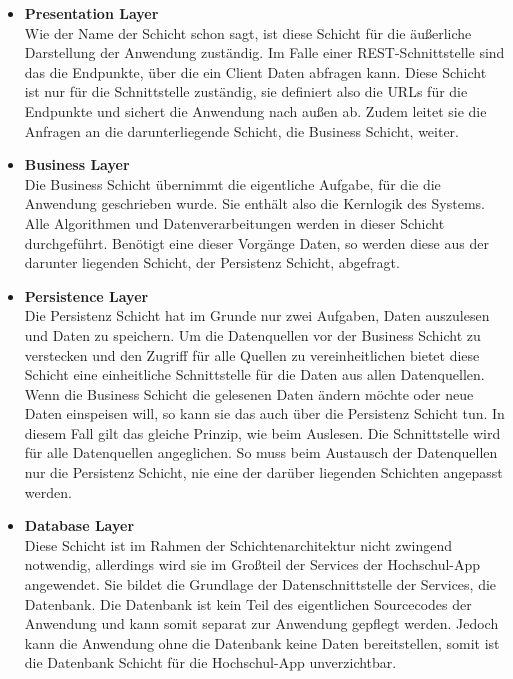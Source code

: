 \begin{itemize}

\item \textbf{Presentation Layer} 
\\
Wie der Name der Schicht schon sagt, ist diese Schicht für die äußerliche Darstellung der Anwendung zuständig. Im Falle einer \ac{REST}-Schnittstelle sind das die Endpunkte, über die ein Client Daten abfragen kann. Diese Schicht ist nur für die Schnittstelle zuständig, sie definiert also die \acp{URL} für die Endpunkte und sichert die Anwendung nach außen ab. Zudem leitet sie die Anfragen an die darunterliegende Schicht, die Business Schicht, weiter.

\item \textbf{Business Layer} 
\\
Die Business Schicht übernimmt die eigentliche Aufgabe, für die die Anwendung geschrieben wurde. Sie enthält also die Kernlogik des Systems. Alle Algorithmen und Datenverarbeitungen werden in dieser Schicht durchgeführt. Benötigt eine dieser Vorgänge Daten, so werden diese aus der darunter liegenden Schicht, der Persistenz Schicht, abgefragt.

\item \textbf{Persistence Layer}
\\
Die Persistenz Schicht hat im Grunde nur zwei Aufgaben, Daten auszulesen und Daten zu speichern. Um die Datenquellen vor der Business Schicht zu verstecken und den Zugriff für alle Quellen zu vereinheitlichen bietet diese Schicht eine einheitliche Schnittstelle für die Daten aus allen Datenquellen. Wenn die Business Schicht die gelesenen Daten ändern möchte oder neue Daten einspeisen will, so kann sie das auch über die Persistenz Schicht tun. In diesem Fall gilt das gleiche Prinzip, wie beim Auslesen. Die Schnittstelle wird für alle Datenquellen angeglichen. So muss beim Austausch der Datenquellen nur die Persistenz Schicht, nie eine der darüber liegenden Schichten angepasst werden.

\item \textbf{Database Layer}
\\
Diese Schicht ist im Rahmen der Schichtenarchitektur nicht zwingend notwendig, allerdings wird sie im Großteil der Services der Hochschul-\ac{App} angewendet. Sie bildet die Grundlage der Datenschnittstelle der Services, die Datenbank. Die Datenbank ist kein Teil des eigentlichen Sourcecodes der Anwendung und kann somit separat zur Anwendung gepflegt werden. Jedoch kann die Anwendung ohne die Datenbank keine Daten bereitstellen, somit ist die Datenbank Schicht für die Hochschul-\ac{App} unverzichtbar.

\end{itemize}

